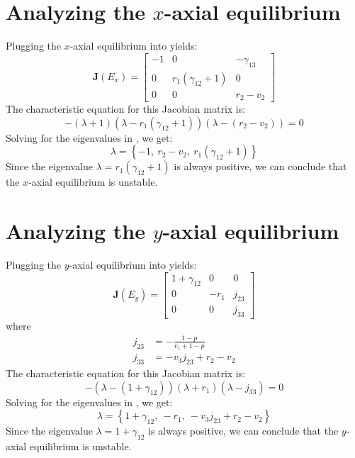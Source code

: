 \section{Analyzing the $x$-axial equilibrium}\label{sec:stability_x_axial_equilibrium}
Plugging the $x$-axial equilibrium into  yields:
\begin{equation}
    \textbf{J}\left(E_x\right)=\begin{bmatrix}
        -1 & 0 & -\gamma_{13}\\
        0 & r_1\left(\gamma_{12}+1\right) & 0\\
        0 & 0 & r_2-v_2
    \end{bmatrix}
    \label{eq:5.4}
\end{equation}
The characteristic equation for this Jacobian matrix is:
\begin{equation}
    -\left(\lambda+1\right)\left(\lambda-r_1\left(\gamma_{12}+1\right)\right)\left(\lambda-\left(r_2-v_2\right)\right)=0
    \label{eq:5.5}
\end{equation}
Solving for the eigenvalues in , we get:
\[
\lambda=\left\{
-1, \
r_2-v_2, \
r_1\left(\gamma_{12}+1\right)
\right\}
\]
Since the eigenvalue $\lambda=r_1\left(\gamma_{12}+1\right)$ is always positive, we can conclude that the $x$-axial equilibrium is unstable.

\section{Analyzing the $y$-axial equilibrium}\label{sec:stability_y_axial_equilibrium}
Plugging the $y$-axial equilibrium into  yields:
\begin{equation}
    \textbf{J}\left(E_y\right)=\begin{bmatrix}
        1+\gamma_{12} & 0 & 0\\
        0 & -r_1 & j_{23}\\
        0 & 0 & j_{33}
    \end{bmatrix}
    \label{eq:5.6}
\end{equation}
where
\begin{align*}
    j_{23} &= -\frac{1-p}{v_1+1-p}\\
    j_{33} &= -v_3j_{23}+r_2-v_2
\end{align*}
The characteristic equation for this Jacobian matrix is:
\begin{equation}
    -\left(\lambda-\left(1+\gamma_{12}\right)\right)\left(\lambda+r_1\right)\left(\lambda-j_{33}\right)=0
    \label{eq:5.7}
\end{equation}
Solving for the eigenvalues in , we get:
\[
\lambda=\left\{
1+\gamma_{12}, \
-r_1, \
-v_3j_{23}+r_2-v_2
\right\}
\]
Since the eigenvalue $\lambda=1+\gamma_{12}$ is always positive, we can conclude that the $y$-axial equilibrium is unstable.

